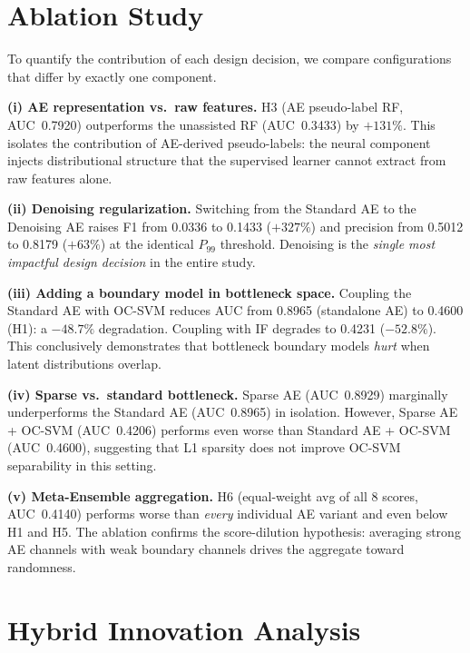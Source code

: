\documentclass[10pt,journal,compsoc]{IEEEtran}
\begin{document}
\section{Ablation Study}
\label{sec:ablation}

To quantify the contribution of each design decision, we compare
configurations that differ by exactly one component.

\textbf{(i) AE representation vs.\ raw features.}
H3 (AE pseudo-label RF, AUC~0.7920) outperforms the unassisted RF
(AUC~0.3433) by $+131\%$.  This isolates the contribution of AE-derived
pseudo-labels: the neural component injects distributional structure
that the supervised learner cannot extract from raw features alone.

\textbf{(ii) Denoising regularization.}
Switching from the Standard AE to the Denoising AE raises F1 from
0.0336 to 0.1433 ($+327\%$) and precision from 0.5012 to 0.8179
($+63\%$) at the identical $P_{99}$ threshold.  Denoising is the
\emph{single most impactful design decision} in the entire study.

\textbf{(iii) Adding a boundary model in bottleneck space.}
Coupling the Standard AE with OC-SVM reduces AUC from 0.8965
(standalone AE) to 0.4600 (H1): a $-48.7\%$ degradation.  Coupling
with IF degrades to 0.4231 ($-52.8\%$).  This conclusively demonstrates
that bottleneck boundary models \emph{hurt} when latent distributions
overlap.

\textbf{(iv) Sparse vs.\ standard bottleneck.}
Sparse AE (AUC~0.8929) marginally underperforms the Standard AE
(AUC~0.8965) in isolation.  However, Sparse AE + OC-SVM (AUC~0.4206)
performs even worse than Standard AE + OC-SVM (AUC~0.4600), suggesting
that L1 sparsity does not improve OC-SVM separability in this setting.

\textbf{(v) Meta-Ensemble aggregation.}
H6 (equal-weight avg of all 8 scores, AUC~0.4140) performs worse than
\emph{every} individual AE variant and even below H1 and H5.  The
ablation confirms the score-dilution hypothesis: averaging strong AE
channels with weak boundary channels drives the aggregate toward
randomness.

\section{Hybrid Innovation Analysis}
\label{sec:innovation}
\end{document}
